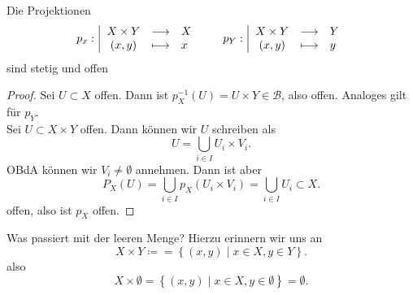 \begin{theorem}\label{thm:projektion-auf-komponente-ist-stetig}
    Die Projektionen
        \begin{equation*}
        p_x: \left| \begin{array}{c c l} 
        X\times Y & \longrightarrow & X \\
        (x,y) & \longmapsto &  x
        \end{array} \right.
        \qquad
        p_Y: \left| \begin{array}{c c l} 
            X\times Y & \longrightarrow & Y \\
            (x,y) & \longmapsto	 &  y
        \end{array} \right.
    \end{equation*}
    sind stetig und offen
\end{theorem}
\begin{proof}
    Sei $U\subset X$ offen. Dann ist $p_X^{-1}(U) = U\times Y\in \mathcal{B}$, also offen. Analoges gilt für $p_Y$. \\
    Sei $U\subset X\times Y$ offen. Dann können wir $U$ schreiben als
     \[
    U = \bigcup_{i \in  I} U_i \times V_i
    .\] 
    OBdA können wir $V_i \neq  \emptyset$ annehmen. Dann ist aber
    \[
        P_X(U) = \bigcup_{i \in  I} p_X(U_i \times V_i) = \bigcup_{i \in  I} U_i \subset X
    .\] 
    offen, also ist $p_X$ offen.
\end{proof}

\begin{recap}
    Was passiert mit der leeren Menge? Hierzu erinnern wir uns an
    \[
        X\times Y \coloneqq  = \left \{(x,y) \mid  x\in X, y\in Y\right\} 
    .\] 
    also
    \[
        X\times \emptyset = \left \{(x,y) \mid  x\in X, y\in \emptyset\right\}  = \emptyset
    .\] 
\end{recap}

